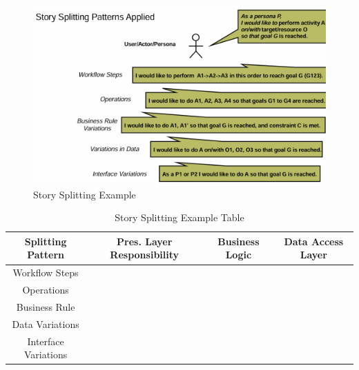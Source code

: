 \documentclass[../Main.tex]{subfiles}
\begin{document}
\begin{figure}[H]
    \centering
    \includegraphics[width=1\linewidth]{Images/appliedstorysplitting.png}
    \caption{Story Splitting Example}
\end{figure}

\begin{table}
    \centering
    \begin{tabular}{|c|c|c|c|} \hline 
        Splitting Pattern&  Pres. Layer Responsibility &  Business Logic& Data Access Layer\\ \hline 
        Workflow Steps&  &  & \\ \hline 
        Operations&  &  & \\ \hline 
        Business Rule&  &  & \\ \hline 
        Data Variations&  &  & \\ \hline 
        Interface Variations& & &\\ \hline
    \end{tabular}
    \caption{Story Splitting Example Table}
\end{table}
\newpage
\end{document}
